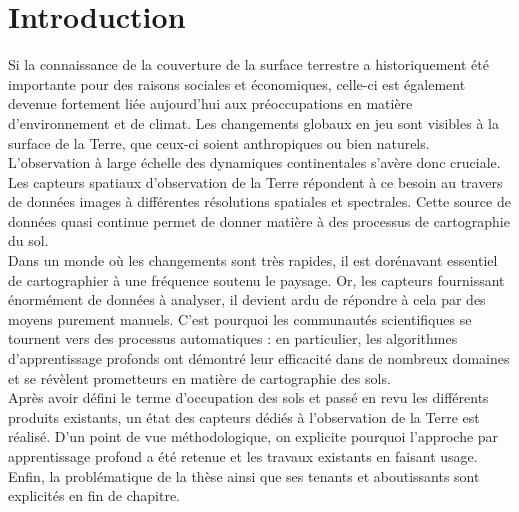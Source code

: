 
\chapter{Introduction} %
\PartialToc

\label{Chapter1} %


\newcommand{\keyword}[1]{\textbf{#1}}
\newcommand{\tabhead}[1]{\textbf{#1}}
\newcommand{\code}[1]{\texttt{#1}}
\newcommand{\file}[1]{\texttt{\bfseries#1}}
\newcommand{\option}[1]{\texttt{\itshape#1}}


Si la connaissance de la couverture de la surface terrestre a historiquement été importante pour des raisons sociales et économiques, celle-ci est également devenue fortement liée aujourd'hui aux préoccupations en matière d'environnement et de climat. Les changements globaux en jeu sont visibles à la surface de la Terre, que ceux-ci soient anthropiques ou bien naturels.\\
L'observation à large échelle des dynamiques continentales s'avère donc cruciale. Les capteurs spatiaux d'observation de la Terre répondent à ce besoin au travers de données images à différentes résolutions spatiales et spectrales. Cette source de données quasi continue permet de donner matière à des processus de cartographie du sol.\\
Dans un monde où les changements sont très rapides, il est dorénavant essentiel de cartographier à une fréquence soutenu le paysage. Or, les capteurs fournissant énormément de données à analyser, il devient ardu de répondre à cela par des moyens purement manuels. C'est pourquoi les communautés scientifiques se tournent vers des processus automatiques : en particulier, les algorithmes d'apprentissage profonds ont démontré leur efficacité dans de nombreux domaines et se révèlent prometteurs en matière de cartographie des sols.\\
Après avoir défini le terme d'occupation des sols et passé en revu les différents produits existants, un état des capteurs dédiés à l'observation de la Terre est réalisé. D'un point de vue méthodologique, on explicite pourquoi l'approche par apprentissage profond a été retenue et les travaux existants en faisant usage. Enfin, la problématique de la thèse ainsi que ses tenants et aboutissants sont explicités en fin de chapitre.
